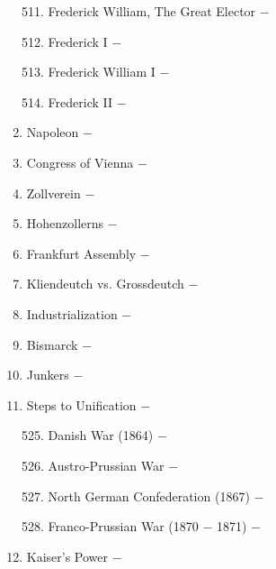 \documentclass[12pt]{article}
\begin{document}
\begin{enumerate}
\begin{enumerate}[label=\arabic{*}.]
\setcounter{enumii}{510}

\item Frederick William, The Great Elector $-$ 

\item Frederick I $-$ 

\item Frederick William I $-$ 

\item Frederick II $-$ 

\end{enumerate}
\setcounter{enumi}{514}

\item Napoleon $-$ 

\item Congress of Vienna $-$ 

\item Zollverein $-$ 

\item Hohenzollerns $-$ 

\item Frankfurt Assembly $-$ 

\item Kliendeutch vs. Grossdeutch $-$ 

\item Industrialization $-$ 

\item Bismarck $-$ 

\item Junkers $-$ 

\item Steps to Unification $-$ 

\begin{enumerate}[label=\arabic{*}.]
\setcounter{enumii}{524}

\item Danish War (1864) $-$ 

\item Austro-Prussian War $-$ 

\item North German Confederation (1867) $-$ 

\item Franco-Prussian War (1870 $-$ 1871) $-$ 

\end{enumerate}
\setcounter{enumi}{526}


\item Kaiser's Power $-$ 


\end{enumerate}
\end{document}
